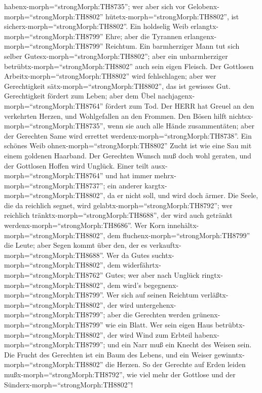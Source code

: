 habenx-morph=``strongMorph:TH8735''; wer aber sich vor
Gelobenx-morph=``strongMorph:TH8802''
hütetx-morph=``strongMorph:TH8802'', ist
sicherx-morph=``strongMorph:TH8802''.  Ein holdselig Weib
erlangtx-morph=``strongMorph:TH8799'' Ehre; aber die Tyrannen
erlangenx-morph=``strongMorph:TH8799'' Reichtum.  Ein
barmherziger Mann tut sich selber Gutesx-morph=``strongMorph:TH8802'';
aber ein unbarmherziger betrübtx-morph=``strongMorph:TH8802'' auch sein
eigen Fleisch.  Der Gottlosen
Arbeitx-morph=``strongMorph:TH8802'' wird fehlschlagen; aber wer
Gerechtigkeit sätx-morph=``strongMorph:TH8802'', das ist gewisses Gut.
 Gerechtigkeit fördert zum Leben; aber dem Übel
nachjagenx-morph=``strongMorph:TH8764'' fördert zum Tod. 
Der HERR hat Greuel an den verkehrten Herzen, und Wohlgefallen an den
Frommen.  Den Bösen hilft
nichtsx-morph=``strongMorph:TH8735'', wenn sie auch alle Hände
zusammentäten; aber der Gerechten Same wird errettet
werdenx-morph=``strongMorph:TH8738''.  Ein schönes Weib
ohnex-morph=``strongMorph:TH8802'' Zucht ist wie eine Sau mit einem
goldenen Haarband.  Der Gerechten Wunsch muß doch wohl
geraten, und der Gottlosen Hoffen wird Unglück.  Einer
teilt ausx-morph=``strongMorph:TH8764'' und hat immer
mehrx-morph=``strongMorph:TH8737''; ein anderer
kargtx-morph=``strongMorph:TH8802'', da er nicht soll, und wird doch
ärmer.  Die Seele, die da reichlich segnet, wird
gelabtx-morph=``strongMorph:TH8792''; wer reichlich
tränktx-morph=``strongMorph:TH8688'', der wird auch getränkt
werdenx-morph=``strongMorph:TH8686''.  Wer Korn
innehältx-morph=``strongMorph:TH8802'', dem
fluchenx-morph=``strongMorph:TH8799'' die Leute; aber Segen kommt über
den, der es verkauftx-morph=``strongMorph:TH8688''.  Wer da
Gutes suchtx-morph=``strongMorph:TH8802'', dem
widerfährtx-morph=``strongMorph:TH8762'' Gutes; wer aber nach Unglück
ringtx-morph=``strongMorph:TH8802'', dem wird's
begegnenx-morph=``strongMorph:TH8799''.  Wer sich auf
seinen Reichtum verläßtx-morph=``strongMorph:TH8802'', der wird
untergehenx-morph=``strongMorph:TH8799''; aber die Gerechten werden
grünenx-morph=``strongMorph:TH8799'' wie ein Blatt.  Wer
sein eigen Haus betrübtx-morph=``strongMorph:TH8802'', der wird Wind zum
Erbteil habenx-morph=``strongMorph:TH8799''; und ein Narr muß ein Knecht
des Weisen sein.  Die Frucht des Gerechten ist ein Baum des
Lebens, und ein Weiser gewinntx-morph=``strongMorph:TH8802'' die Herzen.
 So der Gerechte auf Erden leiden
mußx-morph=``strongMorph:TH8792'', wie viel mehr der Gottlose und der
Sünderx-morph=``strongMorph:TH8802''!

